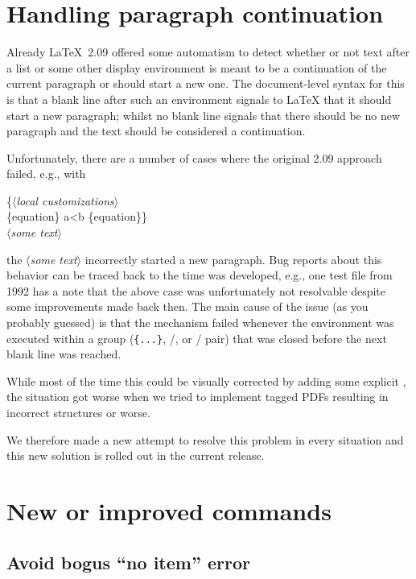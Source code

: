 \documentclass{ltnews}
\providecommand\meta[1]{$\langle$\textrm{\itshape#1}$\rangle$}
\begin{document}
\section{Handling paragraph continuation}

Already \LaTeX~2.09 offered some automatism to detect whether or not
text after a list or some other display environment is meant to be a
continuation of the current paragraph or should start a new one.  The
document-level syntax for this is that a blank line after such an
environment signals to \LaTeX{} that it should start a new paragraph;
whilst no blank line signals that there should be no new paragraph and
the text should be considered a continuation.

Unfortunately, there are a number of cases where the original 2.09
approach failed, e.g., with
\begin{flushleft}
  \ttfamily
\{\meta{local customizations}\\
\{equation\} a<b \{equation\}\} \\
\meta{some text}
\end{flushleft}
the \meta{some text} incorrectly started a new paragraph.  Bug reports
about this behavior can be traced back to the time \LaTeXe{} was
developed, e.g., one test file from 1992 has a note that the above
case was unfortunately not resolvable despite some improvements made
back then.  The main cause of the issue (as you probably guessed) is
that the mechanism failed whenever the environment was executed within
a group (\texttt{\{...\}}, /, or
/ pair) that was closed before the next blank
line was reached.

While most of the time this could be visually corrected by adding some
explicit , the situation got worse when we tried to
implement tagged PDFs resulting in incorrect structures or worse.

We therefore made a new attempt to resolve this problem in every
situation and this new solution is rolled out in the current release.


\section{New or improved commands}

\subsection{Avoid bogus \enquote{no item} error}
\end{document}
